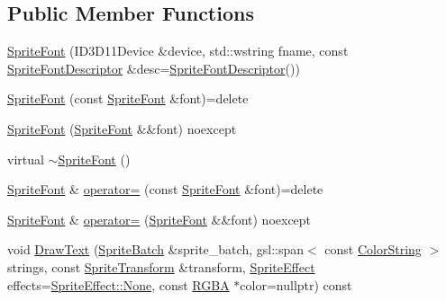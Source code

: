 \subsection*{Public Member Functions}
\begin{DoxyCompactItemize}
\item 
\mbox{\hyperlink{classmage_1_1rendering_1_1_sprite_font_ad89c07ac484130956705880fd294f200}{Sprite\+Font}} (I\+D3\+D11\+Device \&device, std\+::wstring fname, const \mbox{\hyperlink{classmage_1_1rendering_1_1_sprite_font_descriptor}{Sprite\+Font\+Descriptor}} \&desc=\mbox{\hyperlink{classmage_1_1rendering_1_1_sprite_font_descriptor}{Sprite\+Font\+Descriptor}}())
\item 
\mbox{\hyperlink{classmage_1_1rendering_1_1_sprite_font_a80cfc8c939ee3709f7a6f9441a5bd688}{Sprite\+Font}} (const \mbox{\hyperlink{classmage_1_1rendering_1_1_sprite_font}{Sprite\+Font}} \&font)=delete
\item 
\mbox{\hyperlink{classmage_1_1rendering_1_1_sprite_font_a9a2014908c6c63aa9d9ad223383bd03a}{Sprite\+Font}} (\mbox{\hyperlink{classmage_1_1rendering_1_1_sprite_font}{Sprite\+Font}} \&\&font) noexcept
\item 
virtual \mbox{\hyperlink{classmage_1_1rendering_1_1_sprite_font_a51ec0418e1456d7634c6540ccc801644}{$\sim$\+Sprite\+Font}} ()
\item 
\mbox{\hyperlink{classmage_1_1rendering_1_1_sprite_font}{Sprite\+Font}} \& \mbox{\hyperlink{classmage_1_1rendering_1_1_sprite_font_a3d0054493b983437a392c807523d744e}{operator=}} (const \mbox{\hyperlink{classmage_1_1rendering_1_1_sprite_font}{Sprite\+Font}} \&font)=delete
\item 
\mbox{\hyperlink{classmage_1_1rendering_1_1_sprite_font}{Sprite\+Font}} \& \mbox{\hyperlink{classmage_1_1rendering_1_1_sprite_font_a95317d173b64565c6cba865ca524fe2f}{operator=}} (\mbox{\hyperlink{classmage_1_1rendering_1_1_sprite_font}{Sprite\+Font}} \&\&font) noexcept
\item 
void \mbox{\hyperlink{classmage_1_1rendering_1_1_sprite_font_a0be6671c77a11df1e11a7a1568caeb68}{Draw\+Text}} (\mbox{\hyperlink{classmage_1_1rendering_1_1_sprite_batch}{Sprite\+Batch}} \&sprite\+\_\+batch, gsl\+::span$<$ const \mbox{\hyperlink{classmage_1_1rendering_1_1_color_string}{Color\+String}} $>$ strings, const \mbox{\hyperlink{classmage_1_1_sprite_transform}{Sprite\+Transform}} \&transform, \mbox{\hyperlink{namespacemage_1_1rendering_a4dbc3536c87b906f1d41d863ec458e78}{Sprite\+Effect}} effects=\mbox{\hyperlink{namespacemage_1_1rendering_a4dbc3536c87b906f1d41d863ec458e78a6adf97f83acf6453d4a6a4b1070f3754}{Sprite\+Effect\+::\+None}}, const \mbox{\hyperlink{structmage_1_1_r_g_b_a}{R\+G\+BA}} $\ast$color=nullptr) const

\end{DoxyCompactItemize}
